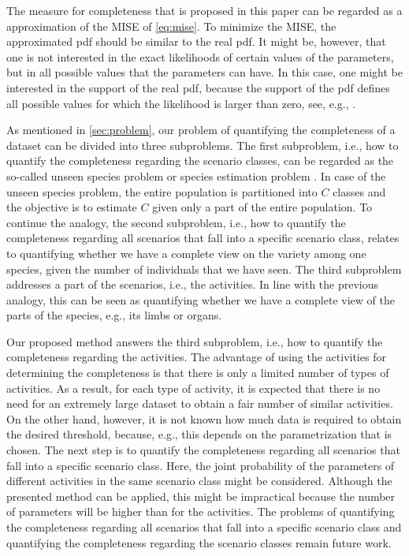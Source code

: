 The measure for completeness that is proposed in this paper can be regarded as a approximation of the MISE of \cref{eq:mise}. To minimize the MISE, the approximated pdf should be similar to the real pdf. It might be, however, that one is not interested in the exact likelihoods of certain values of the parameters, but in all possible values that the parameters can have. In this case, one might be interested in the support of the real pdf, because the support of the pdf defines all possible values for which the likelihood is larger than zero, see, e.g., \textcite{scholkopf2001estimating}.

As mentioned in \cref{sec:problem}, our problem of quantifying the completeness of a dataset can be divided into three subproblems. The first subproblem, i.e., how to quantify the completeness regarding the scenario classes, can be regarded as the so-called unseen species problem \cite{bunge1993estimating, gandolfi2004nonparametric} or species estimation problem \cite{yang2012estimating}. In case of the unseen species problem, the entire population is partitioned into $C$ classes and the objective is to estimate $C$ given only a part of the entire population. To continue the analogy, the second subproblem, i.e., how to quantify the completeness regarding all scenarios that fall into a specific scenario class, relates to quantifying whether we have a complete view on the variety among one species, given the number of individuals that we have seen. The third subproblem addresses a part of the scenarios, i.e., the activities. In line with the previous analogy, this can be seen as quantifying whether we have a complete view of the parts of the species, e.g., its limbs or organs.

Our proposed method answers the third subproblem, i.e., how to quantify the completeness regarding the activities. 
\cstart 
The advantage of using the activities for determining the completeness is that there is only a limited number of types of activities. As a result, for each type of activity, it is expected that there is no need for an extremely large dataset to obtain a fair number of similar activities. On the other hand, however, it is not known how much data is required to obtain the desired threshold, because, e.g., this depends on the parametrization that is chosen. 
\cend 
The next step is to quantify the completeness regarding all scenarios that fall into a specific scenario class. Here, the joint probability of the parameters of different activities in the same scenario class might be considered. Although the presented method can be applied, this might be impractical because the number of parameters will be higher than for the activities. The problems of quantifying the completeness regarding all scenarios that fall into a specific scenario class and quantifying the completeness regarding the scenario classes remain future work.

